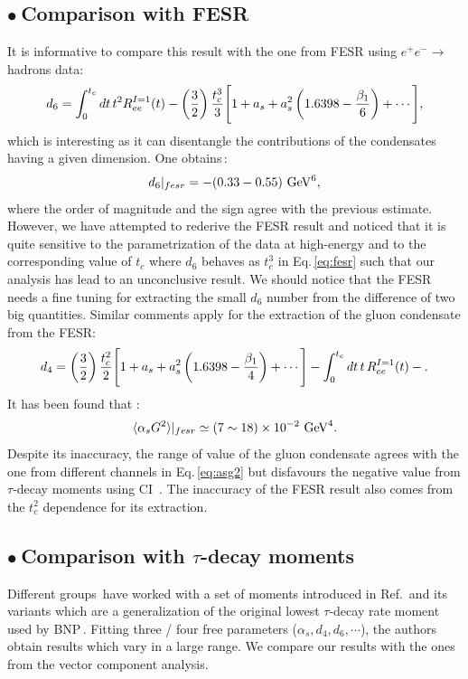 \documentclass[review]{elsarticle}
\def\beq{\begin{equation}}
\def\eeq{\end{equation}}
\def\ga{\left(}
\def\dr{\right)}
\def\la{\langle}
\def\ra{\rangle}
\def\b{$\bullet~$}
\begin{document}
\subsection*{\b Comparison with FESR\,\cite{FESR}}
 It is informative to compare this result with the one from FESR using $e^+e^-\to$ hadrons data:
  \beq
 d_6=\int_0^{t_c} dt \, t^2  R^{I=1}_{ee}(t)-\ga\frac{3}{2}\dr\frac{t_c^3}{3}\Bigg{[} 1+a_s+a_s^2\ga 1.6398-\frac{\beta_1}{6}\dr+\cdots\Bigg{]},
  \label{eq:d6fesr}
  \eeq
  which is interesting as it can disentangle the contributions of the condensates having a given dimension. One obtains\,\cite{FESR}:
 \beq
 d_6\vert_{fesr} = -(0.33-0.55)~{\rm GeV^6},
 \eeq
 where the order of magnitude and the sign agree with the previous estimate. However, we have attempted to rederive the FESR result and noticed that it is quite sensitive to the parametrization of the data at high-energy and to the corresponding value of $t_c$ where $d_6$ behaves as $t_c^3$ in Eq.\,\ref{eq:fesr} such that our analysis has lead to an unconclusive result. We should notice that the FESR needs a fine tuning for  extracting the small $d_6$ number from the difference of two big quantities.  Similar comments apply for the extraction of the gluon condensate from the FESR:
 \beq
 d_4=\ga\frac{3}{2}\dr\frac{t_c^2}{2}\Bigg{[} 1+a_s+a_s^2\ga 1.6398-\frac{\beta_1}{4}\dr+\cdots\Bigg{]}-\int_0^{t_c} dt \, t \, R^{I=1}_{ee}(t)-.
  \eeq
 It has been found that\,\cite{FESR}\,:
 \beq
 \la\alpha_s G^2\ra\vert_{fesr}\simeq (7\sim 18)\times 10^{-2}~{\rm GeV}^4.
 \eeq 
  Despite its inaccuracy, the range of value of the gluon condensate agrees with the one from different  channels in Eq.\,\ref{eq:asg2} but disfavours the negative value from $\tau$-decay moments using CI \,\cite{DAVIER,PICH1}. The inaccuracy of the FESR result also comes from the $t_c^2$ dependence for its extraction.
  \subsection*{\b Comparison with $\tau$-decay moments}
   Different groups\,\cite{BOITO,ALEPH,OPAL,PICH1,PICH2,DAVIER} have  worked  with a set of moments introduced  in Ref.\,\cite{LEDI}  and its variants which are a generalization of the original lowest $\tau$-decay rate moment used by BNP\,\cite{BNP}.  
    Fitting   three / four free  parameters ($\alpha_s, d_4,d_6,\cdots$), the authors obtain results which vary in a large range. We compare our results with the ones  from the vector component analysis. 
\end{document}
